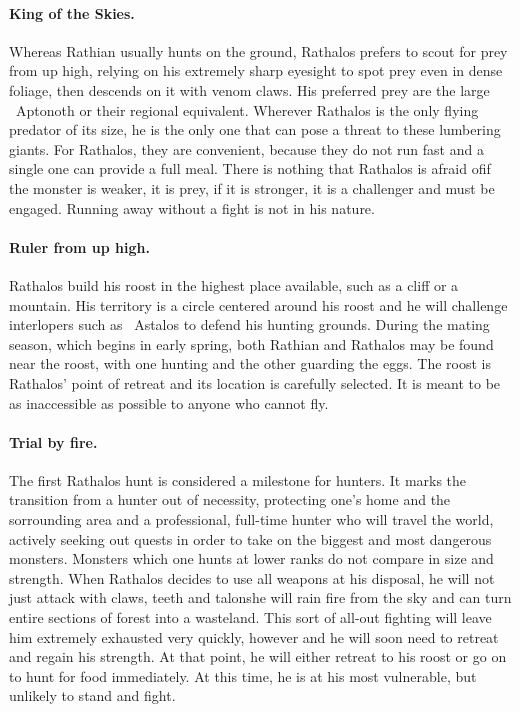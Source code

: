 \paragraph*{King of the Skies.} Whereas Rathian usually hunts on the ground, Rathalos prefers to scout for prey from up high, relying on his extremely sharp eyesight to spot prey even in dense foliage, then descends on it with venom claws. His preferred prey are the large ~Aptonoth or their regional equivalent. Wherever Rathalos is the only flying predator of its size, he is the only one that can pose a threat to these lumbering giants. For Rathalos, they are convenient, because they do not run fast and a single one can provide a full meal. There is nothing that Rathalos is afraid of\hbNone if the monster is weaker, it is prey, if it is stronger, it is a challenger and must be engaged. Running away without a fight is not in his nature.

\paragraph*{Ruler from up high.} Rathalos build his roost in the highest place available, such as a cliff or a mountain. His territory is a circle centered around his roost and he will challenge interlopers such as ~Astalos to defend his hunting grounds. During the mating season, which begins in early spring, both Rathian and Rathalos may be found near the roost, with one hunting and the other guarding the eggs. The roost is Rathalos' point of retreat and its location is carefully selected. It is meant to be as inaccessible as possible to anyone who cannot fly.

\paragraph*{Trial by fire.} The first Rathalos hunt is considered a milestone for hunters. It marks the transition from a hunter out of necessity, protecting one's home and the sorrounding area and a professional, full-time hunter who will travel the world, actively seeking out quests in order to take on the biggest and most dangerous monsters. Monsters which one hunts at lower ranks do not compare in size and strength. When Rathalos decides to use all weapons at his disposal, he will not just attack with claws, teeth and talons\hbNone he will rain fire from the sky and can turn entire sections of forest into a wasteland. This sort of all-out fighting will leave him extremely exhausted very quickly, however and he will soon need to retreat and regain his strength. At that point, he will either retreat to his roost or go on to hunt for food immediately. At this time, he is at his most vulnerable, but unlikely to stand and fight.

